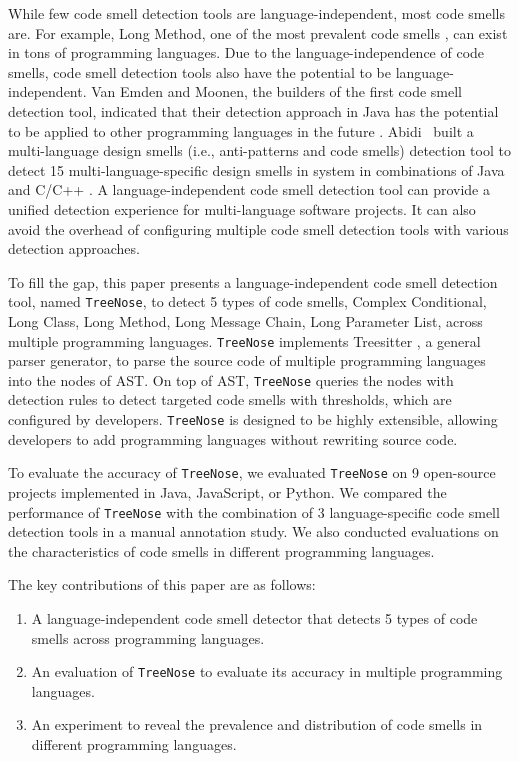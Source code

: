 While few code smell detection tools are language-independent, most code smells
are.
For example, Long Method, one of the most prevalent code smells
\cite{developersCare}, can exist in tons of programming languages.
Due to the language-independence of code smells, code smell detection tools
also have the potential to be language-independent.
Van Emden and Moonen, the builders of the first code smell detection tool,
indicated that their detection approach in Java has the potential to be applied
to other programming languages in the future \cite{1173068}.
Abidi~\etal{} built a multi-language design smells (i.e., anti-patterns and
code smells) detection tool to detect 15 multi-language-specific design smells
in system in combinations of Java and C/C++
\cite{MultiLanguageCodeSmells,Fault-Prone}.
A language-independent code smell detection tool can provide a unified
detection experience for multi-language software projects.
It can also avoid the overhead of configuring multiple code smell detection
tools with various detection approaches.

To fill the gap, this paper presents a language-independent code smell
detection tool, named \texttt{TreeNose}, to detect 5 types of code smells,
Complex Conditional, Long Class, Long Method, Long Message Chain, Long
Parameter List, across multiple programming languages.
\texttt{TreeNose} implements Treesitter \cite{treeSitter}, a general parser generator,
to parse the source code of multiple programming languages into the nodes of AST.
On top of AST, \texttt{TreeNose} queries the nodes with detection rules to
detect targeted code smells with thresholds, which are configured by
developers.
\texttt{TreeNose} is designed to be highly extensible, allowing developers to add programming languages without rewriting source code.

To evaluate the accuracy of \texttt{TreeNose}, we evaluated \texttt{TreeNose}
on 9 open-source projects implemented in Java, JavaScript, or Python.
We compared the performance of \texttt{TreeNose} with the combination of 3
language-specific code smell detection tools in a manual annotation study.
We also conducted evaluations on the characteristics of code smells in
different programming languages.

The key contributions of this paper are as follows:

\begin{enumerate}

    \item A language-independent code smell detector that detects 5 types of
        code smells across programming languages.

    \item An evaluation of \texttt{TreeNose} to evaluate its accuracy in
        multiple programming languages.

    \item An experiment to reveal the prevalence and distribution of code smells
        in different programming languages.

\end{enumerate}

